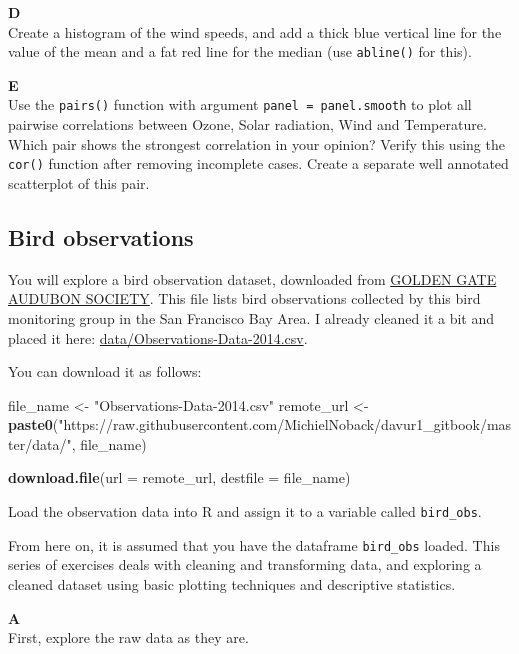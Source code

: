 \documentclass[]{book}
\newenvironment{Shaded}{\begin{snugshade}}{\end{snugshade}}
\newcommand{\DataTypeTok}[1]{\textcolor[rgb]{0.13,0.29,0.53}{#1}}
\newcommand{\KeywordTok}[1]{\textcolor[rgb]{0.13,0.29,0.53}{\textbf{#1}}}
\newcommand{\NormalTok}[1]{#1}
\newcommand{\StringTok}[1]{\textcolor[rgb]{0.31,0.60,0.02}{#1}}
\begin{document}
\textbf{D}\\
Create a histogram of the wind speeds, and add a thick blue vertical line for the value of the mean and a fat red line for the median (use \texttt{abline()} for this).

\textbf{E}\\
Use the \texttt{pairs()} function with argument \texttt{panel\ =\ panel.smooth} to plot all pairwise correlations between Ozone, Solar radiation, Wind and Temperature. Which pair shows the strongest correlation in your opinion? Verify this using the \texttt{cor()} function after removing incomplete cases. Create a separate well annotated scatterplot of this pair.

\hypertarget{bird-observations}{%
\subsection{Bird observations}\label{bird-observations}}

You will explore a bird observation dataset, downloaded from \href{http://goldengateaudubon.org/birding-resources/observations/}{GOLDEN GATE AUDUBON SOCIETY}. This file lists bird observations collected by this bird monitoring group in the San Francisco Bay Area. I already cleaned it a bit and placed it here: \url{data/Observations-Data-2014.csv}.

You can download it as follows:

\begin{Shaded}
\begin{Highlighting}[]
\NormalTok{file_name <-}\StringTok{ "Observations-Data-2014.csv"}
\NormalTok{remote_url <-}\StringTok{ }\KeywordTok{paste0}\NormalTok{(}\StringTok{"https://raw.githubusercontent.com/MichielNoback/davur1_gitbook/master/data/"}\NormalTok{, file_name)}

\KeywordTok{download.file}\NormalTok{(}\DataTypeTok{url =}\NormalTok{ remote_url, }\DataTypeTok{destfile =}\NormalTok{ file_name)}
\end{Highlighting}
\end{Shaded}

Load the observation data into R and assign it to a variable called \texttt{bird\_obs}.

From here on, it is assumed that you have the dataframe \texttt{bird\_obs} loaded. This series of exercises deals with cleaning and transforming data, and exploring a cleaned dataset using basic plotting techniques and descriptive statistics.

\textbf{A}\\
First, explore the raw data as they are.
\end{document}
